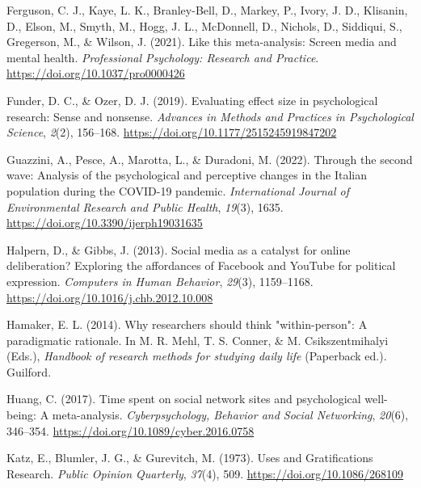 \documentclass[
  man,mask,floatsintext]{apa7}
\newlength{\cslhangindent}
\newlength{\cslentryspacingunit} %
\newenvironment{CSLReferences}[2] %
 {%
  \setlength{\parindent}{0pt}
  \ifodd #1
  \let\oldpar\par
  \def\par{\hangindent=\cslhangindent\oldpar}
  \fi
  \setlength{\parskip}{#2\cslentryspacingunit}
 }%
 {}
\begin{document}
\begin{CSLReferences}{1}{0}
\leavevmode{}%
Ferguson, C. J., Kaye, L. K., Branley-Bell, D., Markey, P., Ivory, J. D., Klisanin, D., Elson, M., Smyth, M., Hogg, J. L., McDonnell, D., Nichols, D., Siddiqui, S., Gregerson, M., \& Wilson, J. (2021). Like this meta-analysis: {Screen} media and mental health. \emph{Professional Psychology: Research and Practice}. \url{https://doi.org/10.1037/pro0000426}

\leavevmode{}%
Funder, D. C., \& Ozer, D. J. (2019). Evaluating effect size in psychological research: {Sense} and nonsense. \emph{Advances in Methods and Practices in Psychological Science}, \emph{2}(2), 156--168. \url{https://doi.org/10.1177/2515245919847202}

\leavevmode{}%
Guazzini, A., Pesce, A., Marotta, L., \& Duradoni, M. (2022). Through the second wave: {Analysis} of the psychological and perceptive changes in the {Italian} population during the {COVID-19} pandemic. \emph{International Journal of Environmental Research and Public Health}, \emph{19}(3), 1635. \url{https://doi.org/10.3390/ijerph19031635}

\leavevmode{}%
Halpern, D., \& Gibbs, J. (2013). Social media as a catalyst for online deliberation? {Exploring} the affordances of {Facebook} and {YouTube} for political expression. \emph{Computers in Human Behavior}, \emph{29}(3), 1159--1168. \url{https://doi.org/10.1016/j.chb.2012.10.008}

\leavevmode{}%
Hamaker, E. L. (2014). Why researchers should think "within-person": {A} paradigmatic rationale. In M. R. Mehl, T. S. Conner, \& M. Csikszentmihalyi (Eds.), \emph{Handbook of research methods for studying daily life} (Paperback ed.). {Guilford}.

\leavevmode{}%
Huang, C. (2017). Time spent on social network sites and psychological well-being: {A} meta-analysis. \emph{Cyberpsychology, Behavior and Social Networking}, \emph{20}(6), 346--354. \url{https://doi.org/10.1089/cyber.2016.0758}

\leavevmode{}%
Katz, E., Blumler, J. G., \& Gurevitch, M. (1973). Uses and {Gratifications Research}. \emph{Public Opinion Quarterly}, \emph{37}(4), 509. \url{https://doi.org/10.1086/268109}


\end{CSLReferences}
\end{document}
